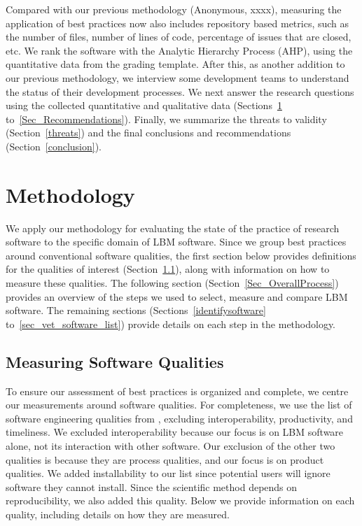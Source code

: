 \documentclass[final, 3p, times, authoryear]{elsarticle}
\begin{document}
Compared with our previous methodology (Anonymous, xxxx)\footnotemark[1],
measuring the application of best practices now also includes
repository based metrics, such as the number of files, number of lines of code,
percentage of issues that are closed, etc.  We rank the software with the
Analytic Hierarchy Process (AHP), using the quantitative data from the grading
template. After this, as another addition to our previous methodology, we
interview some development teams to understand the status of their
development processes. We next answer the research questions using the collected
quantitative and qualitative data (Sections~\ref{methodology}
to~\ref{Sec_Recommendations}).  Finally, we summarize the threats to validity
(Section~\ref{threats}) and the final conclusions and recommendations
(Section~\ref{conclusion}).

\section{Methodology} \label{methodology}

We apply our methodology for evaluating the state of the practice of research
software %
to the specific domain of
LBM software.  Since we group best practices around conventional software
qualities, the first section below provides definitions for the qualities of
interest (Section~\ref{softwarequalities}), along with information on how to
measure these qualities. The following section
(Section~\ref{Sec_OverallProcess}) provides an overview of the steps we used to
select, measure and compare LBM software.  The remaining sections
(Sections~\ref{identifysoftware} to~\ref{sec_vet_software_list}) provide details
on each step in the methodology. 

\subsection{Measuring Software Qualities} \label{softwarequalities}

To ensure our assessment of best practices is organized and complete, we centre
our measurements around software qualities. For completeness, we use the list of
software engineering qualities from \citet[p.\ 17--33]{GhezziEtAl2003},
excluding interoperability, productivity, and timeliness. We excluded
interoperability because our focus is on LBM software alone, not its interaction
with other software. Our exclusion of the other two qualities is because they
are process qualities, and our focus is on product qualities. We added
installability to our list since potential users will ignore software they
cannot install.  Since the scientific method depends on reproducibility, we also
added this quality. Below we provide information on each quality, including
details on how they are measured. 
\end{document}
